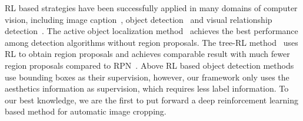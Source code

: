 \documentclass[10pt,twocolumn,letterpaper]{article}
\begin{document}
RL based strategies have been successfully applied in many domains of computer vision, including image caption~\cite{ren2017deep}, object detection~\cite{caicedo2015active,jie2016tree} and visual relationship detection~\cite{liang2017deep}. The active object localization method~\cite{caicedo2015active} achieves the best performance among detection algorithms without region proposals. The tree-RL method~\cite{jie2016tree} uses RL to obtain region proposals and achieves comparable result with much fewer region proposals compared to RPN~\cite{renNIPS15fasterrcnn}. Above RL based object detection methods use bounding boxes as their supervision, however, our framework only uses the aesthetics information as supervision, which requires less label information. To our best knowledge, we are the first to put forward a deep reinforcement learning based method for automatic image cropping.
\end{document}
